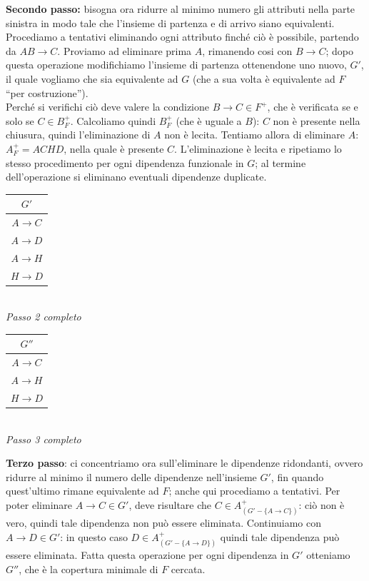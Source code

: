 \begin{exmp}
\noindent \textbf{Secondo passo:} bisogna ora ridurre al minimo numero gli attributi nella parte sinistra in modo tale che l'insieme di partenza
e di arrivo siano equivalenti. Procediamo a tentativi eliminando ogni attributo finché ciò è possibile, partendo da $AB\rightarrow C$. Proviamo 
ad eliminare prima $A$, rimanendo cosi con $B\rightarrow C$; dopo questa operazione modifichiamo l'insieme di partenza ottenendone
uno nuovo, $G'$, il quale vogliamo che sia equivalente ad $G$ (che a sua volta è equivalente ad $F$ ``per costruzione'').\\
Perché si verifichi ciò deve valere la condizione $B\rightarrow C \in F^+$, che è verificata se e solo se $C \in B^+_F$.
Calcoliamo quindi $B^+_F$ (che è uguale a $B$): $C$ non è presente nella chiusura, quindi l'eliminazione di $A$ non è 
lecita. Tentiamo allora di eliminare $A$: $A^+_F=ACHD$, nella quale è presente $C$. L'eliminazione è lecita e ripetiamo lo stesso
procedimento per ogni dipendenza funzionale in $G$; al termine dell'operazione si eliminano eventuali dipendenze duplicate.
\begin{multicols}{2}
\begin{multicols}{2}
\begin{tabular}{|c|}
  \hline
  $G'$\\
  \hline
  $A\rightarrow C$\\
  $A\rightarrow D$\\
  $A\rightarrow H$\\
  $H\rightarrow D$\\
  \hline
 \end{tabular}\\
 
 \emph{\small Passo 2 completo}\\
 
 \begin{tabular}{|c|}
  \hline
  $G''$\\
  \hline
  $A\rightarrow C$\\
  $A\rightarrow H$\\
  $H\rightarrow D$\\
  \hline
 \end{tabular}\\
 
 \emph{\small Passo 3 completo}\\
\end{multicols}
\end{multicols}

\noindent \textbf{Terzo passo}: ci concentriamo ora sull'eliminare le dipendenze ridondanti, ovvero ridurre al minimo il numero
delle dipendenze nell'insieme $G'$, fin quando quest'ultimo rimane equivalente ad $F$; anche qui procediamo a tentativi. Per poter
eliminare $A\rightarrow C \in G'$, deve risultare che $C \in A^+_{(G'-\{A\rightarrow C\})}$: ciò non è vero, quindi tale dipendenza
non può essere eliminata. Continuiamo con $A\rightarrow D \in G'$: in questo caso $D \in A^+_{(G'-\{A\rightarrow D\})}$ quindi tale 
dipendenza può essere eliminata. Fatta questa operazione per ogni dipendenza in $G'$ otteniamo $G''$, che è la copertura minimale di
$F$ cercata.
\end{exmp}


